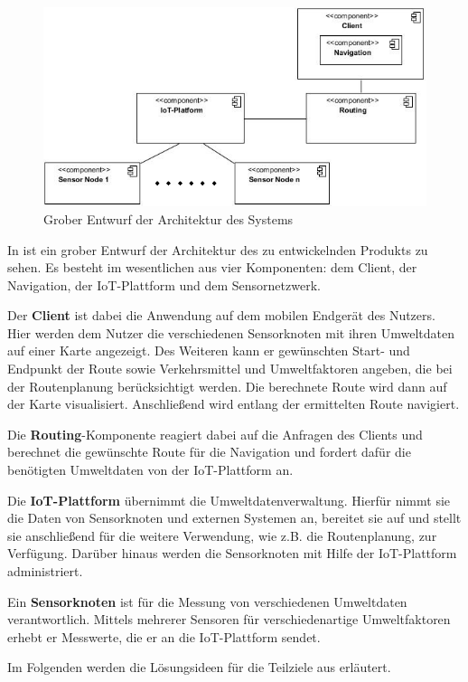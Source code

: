 \begin{figure}[h]
	\centering
	\includegraphics[width=0.75\linewidth]{ressourcen/ArchitectureFirstDraft}
	\caption{Grober Entwurf der Architektur des Systems}
	\label{fig:ArcitectureFirstDraft}
\end{figure}
In  ist ein grober Entwurf der Architektur des zu entwickelnden Produkts zu sehen. Es besteht im wesentlichen aus vier Komponenten: dem Client, der Navigation, der IoT-Plattform und dem Sensornetzwerk.

Der \textbf{Client} ist dabei die Anwendung auf dem mobilen Endgerät des Nutzers. Hier werden dem Nutzer die verschiedenen Sensorknoten mit ihren Umweltdaten auf einer Karte angezeigt. Des Weiteren kann er gewünschten Start- und Endpunkt der Route sowie Verkehrsmittel und Umweltfaktoren angeben, die bei der Routenplanung berücksichtigt werden. Die berechnete Route wird dann auf der Karte visualisiert. Anschließend wird entlang der ermittelten Route navigiert.

Die \textbf{Routing}-Komponente reagiert dabei auf die Anfragen des Clients und berechnet die gewünschte Route für die Navigation und fordert dafür die benötigten Umweltdaten von der IoT-Plattform an.

Die \textbf{IoT-Plattform} übernimmt die Umweltdatenverwaltung. Hierfür nimmt sie die Daten von Sensorknoten und externen Systemen an, bereitet sie auf und stellt sie anschließend für die weitere Verwendung, wie z.B. die Routenplanung, zur Verfügung. Darüber hinaus werden die Sensorknoten mit Hilfe der IoT-Plattform administriert.

Ein \textbf{Sensorknoten} ist für die Messung von verschiedenen Umweltdaten verantwortlich. Mittels mehrerer Sensoren für verschiedenartige Umweltfaktoren erhebt er Messwerte, die er an die IoT-Plattform sendet.

Im Folgenden werden die Lösungsideen für die Teilziele aus  erläutert.

